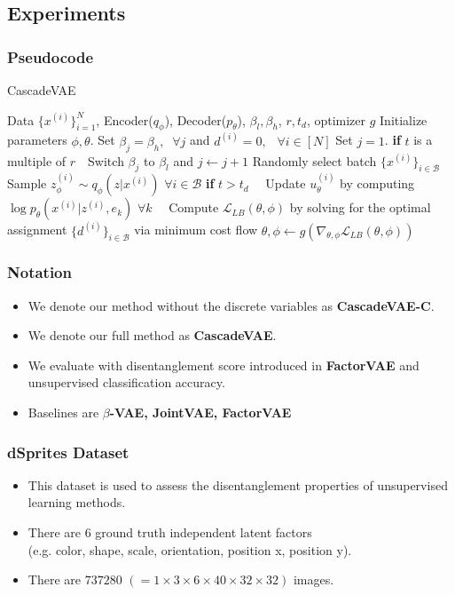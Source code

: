 \documentclass[10pt,mathserif]{beamer}
\newcommand{\algorithmicinput}{\textbf{input}}
\newcommand{\INPUT}{\item[\algorithmicinput]}
\begin{document}
\subsection{Experiments}
\begin{frame}
\frametitle{Pseudocode}
\begin{algorithm}[H]
\caption{CascadeVAE}
\footnotesize
\begin{algorithmic}[1]
\INPUT Data $\{x^{(i)}\}_{i=1}^N$, Encoder($q_\phi$), Decoder($p_\theta$), $\beta_l, \beta_h$, $r, t_d$, optimizer $g$
\STATE Initialize parameters $\phi, \theta$.
\STATE Set $\beta_j=\beta_h,~$ $\forall j$ and $d^{(i)}=0,$ $~~\forall i\in [N]$
\STATE Set $j=1$.
\STATE \textbf{if} $t$ is a multiple of $r$
\STATE $~~~$Switch $\beta_j$ to $\beta_l$ and $j\leftarrow j+1$
\STATE Randomly select batch $\{x^{(i)}\}_{i \in \mathcal{B}}$
\STATE Sample $z^{(i)}_\phi \sim q_{\phi}(z|x^{(i)})$ $\forall i \in \mathcal{B}$ 
\STATE \textbf{if} $t>t_d$
\STATE $~~~$ Update $u_\theta^{(i)}$ by computing $\log p_\theta(x^{(i)}|z^{(i)}, e_k)$ $\forall k$
\STATE $~~~$ Compute $\mathcal{L}_{LB}(\theta, \phi)$ by solving for the optimal \\
\qquad assignment $\{d^{(i)}\}_{i\in \mathcal{B}}$ via minimum cost flow 
\STATE $\theta, \phi \leftarrow g\left(\nabla_{\theta,\phi} \mathcal{L}_{LB}(\theta,\phi)\right)$
\ENDFOR
\end{algorithmic}
\end{algorithm}
\end{frame}


\begin{frame}
\frametitle{Notation}
\begin{itemize}\itemsep=12pt
\item We denote our method without the discrete variables as \textbf{CascadeVAE-C}.
\item We denote our full method as \textbf{CascadeVAE}. 
\item We evaluate with disentanglement score introduced in \textbf{FactorVAE} and unsupervised classification accuracy.
\item Baselines are \textbf{$\beta$-VAE, JointVAE, FactorVAE}
\end{itemize}
\end{frame}

\begin{frame}
\frametitle{dSprites Dataset}
\begin{itemize}\itemsep=20pt
\item This dataset is used to assess the disentanglement properties of unsupervised learning methods.\pause
\item There are 6 ground truth independent latent factors\\
    (e.g. color, shape, scale, orientation, position x, position y).\pause
\item There are $737280$ $(=1\times3\times6\times40\times32\times32)$ images.
\end{itemize}
\end{frame}
\end{document}
